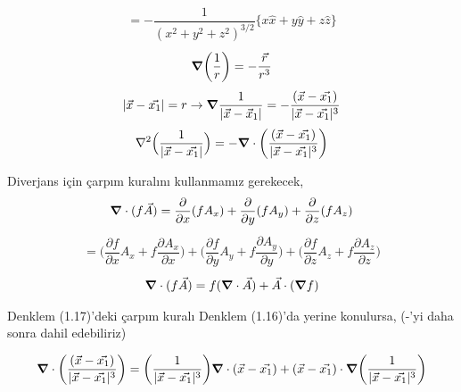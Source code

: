 \newpage 
 

\begin{align}
    = - \dfrac{1}{(x^{2} + y^{2} + z^{2})^{3/2}} \bigg\{ x \hat{x} + y \hat{y} + z \hat{z} \bigg\} 
\end{align}
\begin{align}
\grad (\dfrac{1}{r})= -\dfrac{\Vec{r}}{r^{3}}
\end{align}
\begin{align}
|\Vec{x} - \Vec{x_{1}}| = r \rightarrow \grad \dfrac{1}{|\Vec{x} - \Vec{x}_{1}|}= - \dfrac{(\Vec{x} - \Vec{x_{1}})}{|\Vec{x} - \Vec{x_{1}}|^{3}}
\end{align}
\begin{align}
 \nabla^{2} \Big( \dfrac{1}{|\Vec{x} - \Vec{x_{1}}|} \Big) = - \grad \cdot \bigg( \dfrac{(\Vec{x} - \Vec{x_{1}})}{|\Vec{x} - \Vec{x_{1}}|^{3}} \bigg)
\end{align}

Diverjans için çarpım kuralını kullanmamız gerekecek,
\begin{align*}
    \grad \cdot (f \Vec{A}) = \dfrac{\partial}{\partial x} (f A_{x}) + \dfrac{\partial}{\partial y} (f A_{y}) + \dfrac{\partial}{\partial z} (f A_{z})
\end{align*}
\begin{align*}
    = \bigg(  \dfrac{\partial f}{\partial x} A_{x} + f \dfrac{\partial A_{x}}{\partial x} \bigg) + \bigg(  \dfrac{\partial f}{\partial y} A_{y} + f \dfrac{\partial A_{y}}{\partial y} \bigg) + \bigg(  \dfrac{\partial f}{\partial z} A_{z} + f \dfrac{\partial A_{z}}{\partial z} \bigg)
\end{align*}
\begin{align}
\grad \cdot (f \Vec{A}) = f (\grad \cdot \Vec{A}) + \Vec{A} \cdot (\grad f)  
\end{align}

Denklem (1.17)'deki çarpım kuralı Denklem (1.16)'da yerine konulursa, (-'yi daha sonra dahil edebiliriz)

\begin{align}
\grad \cdot \bigg( \dfrac{(\Vec{x} - \Vec{x_{1}})}{|\Vec{x} - \Vec{x_{1}}|^{3}} \bigg) = \bigg( \dfrac{1}{|\Vec{x} - \Vec{x_{1}}|^{3}} \bigg) \grad \cdot (\Vec{x} - \Vec{x_{1}}) + (\Vec{x} - \Vec{x_{1}}) \cdot \grad \bigg( \dfrac{1}{|\Vec{x} - \Vec{x_{1}}|^{3}} \bigg)
\end{align}

